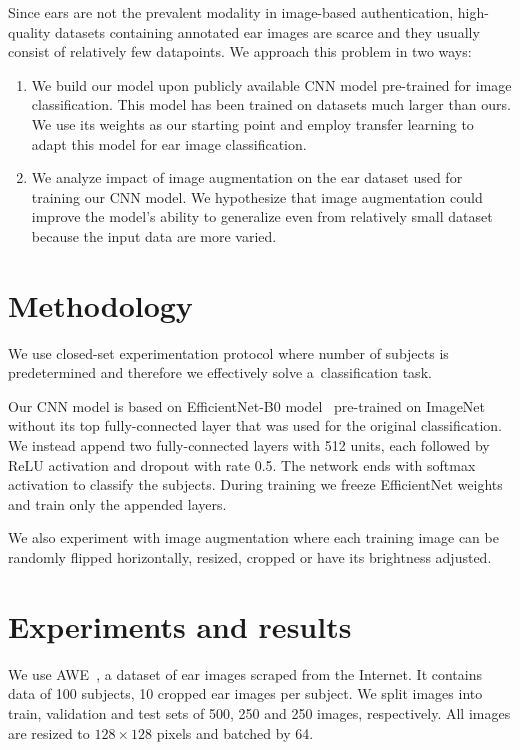 \documentclass[9pt]{IEEEtran}
\begin{document}
Since ears are not the prevalent modality in image-based authentication, high-quality datasets containing annotated ear images are scarce and they usually consist of relatively few datapoints.
We approach this problem in two ways:
\begin{enumerate}
    \item We build our model upon publicly available CNN model pre-trained for image classification.
          This model has been trained on datasets much larger than ours.
          We use its weights as our starting point and employ transfer learning to adapt this model for ear image classification.
    \item We analyze impact of image augmentation on the ear dataset used for training our CNN model.
          We hypothesize that image augmentation could improve the model's ability to generalize even from relatively small dataset because the input data are more varied.
\end{enumerate}

\section{Methodology}\label{sec:meth}

We use closed-set experimentation protocol where number of subjects is predetermined and therefore we effectively solve a~classification task.

Our CNN model is based on EfficientNet-B0 model~\cite{efficientNet} pre-trained on ImageNet~\cite{imageNet} without its top fully-connected layer that was used for the original classification.
We instead append two fully-connected layers with 512 units, each followed by ReLU activation and dropout with rate 0.5.
The network ends with softmax activation to classify the subjects.
During training we freeze EfficientNet weights and train only the appended layers.

We also experiment with image augmentation where each training image can be randomly flipped horizontally, resized, cropped or have its brightness adjusted.

\section{Experiments and results}

We use AWE~\cite{emersic2017ear}, a dataset of ear images scraped from the Internet.
It contains data of 100 subjects, 10 cropped ear images per subject.
We split images into train, validation and test sets of 500, 250 and 250 images, respectively.
All images are resized to $128 \times 128$ pixels and batched by 64.
\end{document}
